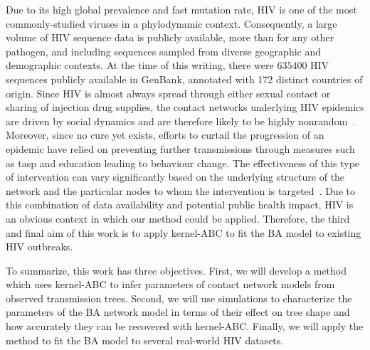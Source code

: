 Due to its high global prevalence and fast mutation rate, \gls{HIV} is one of
the most commonly-studied viruses in a phylodynamic context. Consequently, a
large volume of \gls{HIV} sequence data is publicly available, more than for
any other pathogen, and including sequences sampled from diverse geographic and
demographic contexts. At the time of this writing, there were $635400$ HIV
sequences publicly available in GenBank, annotated with 172 distinct countries
of origin. Since \gls{HIV} is almost always spread through either sexual
contact or sharing of injection drug supplies, the contact networks underlying
\gls{HIV} epidemics are driven by social dynamics and are therefore likely to
be highly nonrandom~\autocite{clemenccon2015statistical}. Moreover, since no
cure yet exists, efforts to curtail the progression of an epidemic have relied
on preventing further transmissions through measures such as \gls{tasp} and
education leading to behaviour change. The effectiveness of this type of
intervention can vary significantly based on the underlying structure of the
network and the particular nodes to whom the intervention is
targeted~\autocite{little2014using,wang2015targeting}. Due to this combination
of data availability and potential public health impact, \gls{HIV} is an
obvious context in which our method could be applied. Therefore, the third and
final aim of this work is to apply kernel-\gls{ABC} to fit the \gls{BA} model
to existing \gls{HIV} outbreaks.

To summarize, this work has three objectives. First, we will develop a method
which uses kernel-\gls{ABC} to infer parameters of contact network models from
observed transmission trees. Second, we will use simulations to characterize
the parameters of the \gls{BA} network model in terms of their effect on tree
shape and how accurately they can be recovered with kernel-\gls{ABC}. Finally,
we will apply the method to fit the \gls{BA} model to several real-world
\gls{HIV} datasets.

